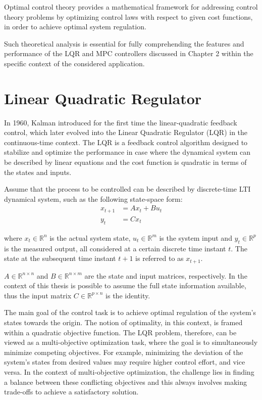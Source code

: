 \documentclass[a4paper,12pt,oneside]{book}
\begin{document}
Optimal control theory provides a mathematical framework for addressing control theory problems by optimizing control laws with respect to given cost functions, in order to achieve optimal system regulation.

Such theoretical analysis is essential for fully comprehending the features and performance of the LQR and MPC controllers discussed in Chapter 2 within the specific context of the considered application.

\section{Linear Quadratic Regulator}
In 1960, Kalman introduced for the first time the linear-quadratic feedback control, which later evolved into the Linear Quadratic Regulator (LQR) \cite{kalman_contributions} in the continuous-time context. 
The LQR is a feedback control algorithm designed to stabilize and optimize the performance in case where the dynamical system can be described by linear equations and the cost function is quadratic in terms of the states and inputs. 

\bigskip
Assume that the process to be controlled can be described by discrete-time LTI dynamical system, such as the following state-space form:
\begin{equation} 
\begin{aligned}
    x_{t+1} &= A x_t + B u_t \\
    y_t &= C x_t
\end{aligned}
\label{eq:Linear_model}
\end{equation}

where $x_t \in \mathbb{R}^n$ is the actual system state, $u_t \in \mathbb{R}^m$ is the system input and $y_t \in \mathbb{R}^p$ is the measured output, all considered at a certain discrete time instant $t$. 
The state at the subsequent time instant $t+1$ is referred to as $x_{t+1}$.

$A \in \mathbb{R}^{n\times n}$ and $B\in \mathbb{R}^{n\times m}$ are the state and input matrices, respectively.
In the context of this thesis is possible to assume the full state information available, thus the input matrix $C \in \mathbb{R}^{p\times n}$ is the identity. 

\bigskip
The main goal of the control task is to achieve optimal regulation of the system's states towards the origin. 
The notion of optimality, in this context, is framed within a quadratic objective function.
The LQR problem, therefore, can be viewed as a multi-objective optimization task, where the goal is to simultaneously minimize competing objectives.
For example, minimizing the deviation of the system's states from desired values may require higher control effort, and vice versa.
In the context of multi-objective optimization, the challenge lies in finding a balance between these conflicting objectives and this always involves making trade-offs to achieve a satisfactory solution.
\end{document}
